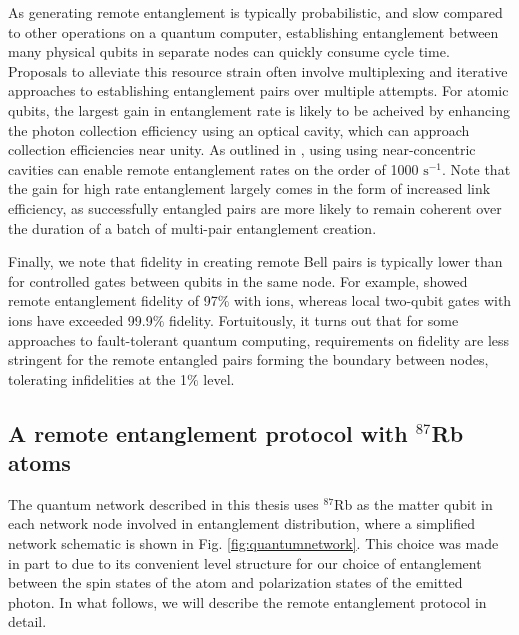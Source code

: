 As generating remote entanglement is typically probabilistic, and slow compared to other operations on a quantum computer, establishing entanglement between many physical qubits in separate nodes can quickly consume cycle time. Proposals to alleviate this resource strain often involve multiplexing\cite{Huie2021} and iterative approaches to establishing entanglement pairs over multiple attempts\cite{li2024high}. For atomic qubits, the largest gain in entanglement rate is likely to be acheived by enhancing the photon collection efficiency using an optical cavity, which can approach collection efficiencies near unity. As outlined in \cite{Young2022}, using using near-concentric cavities can enable remote entanglement rates on the order of 1000 $\text{s}^{-1}$. Note that the gain for high rate entanglement largely comes in the form of increased link efficiency, as successfully entangled pairs are more likely to remain coherent over the duration of a batch of multi-pair entanglement creation. 

Finally, we note that fidelity in creating remote Bell pairs is typically lower than for controlled gates between qubits in the same node. For example, \cite{saha2024high} showed remote entanglement fidelity of 97$\%$ with ions, whereas local two-qubit gates with ions have exceeded 99.9$\%$ fidelity\cite{harty2014high, ballance2016high, clark2021high,srinivas2021high}. Fortuitously, it turns out that for some approaches to fault-tolerant quantum computing, requirements on fidelity are less stringent for the remote entangled pairs forming the boundary between nodes, tolerating infidelities at the 1$\%$ level\cite{ramette2024fault}.

\subsection{A remote entanglement protocol with $^{87}$Rb atoms}

The quantum network described in this thesis uses $^{87}$Rb as the matter qubit in each network node involved in entanglement distribution, where a simplified network schematic is shown in Fig. \ref{fig:quantumnetwork}. This choice was made in part to due to its convenient level structure for our choice of entanglement between the spin states of the atom and polarization states of the emitted photon. In what follows, we will describe the remote entanglement protocol in detail.


